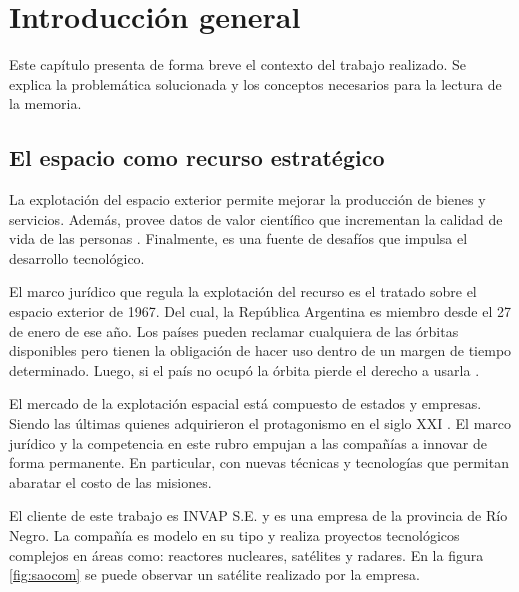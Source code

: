 \chapter{Introducción general}
\label{ch:introduccion}

Este capítulo presenta de forma breve el contexto del trabajo realizado.
Se explica la problemática solucionada y los conceptos necesarios para la lectura de la memoria.

\newcommand{\keyword}[1]{\textbf{#1}}
\newcommand{\tabhead}[1]{\textbf{#1}}
\newcommand{\code}[1]{\texttt{#1}}
\newcommand{\file}[1]{\texttt{\bfseries#1}}
\newcommand{\option}[1]{\texttt{\itshape#1}}
\newcommand{\grados}{$^{\circ}$}

\section{El espacio como recurso estratégico}
\label{sec:1space}

La explotación del espacio exterior permite mejorar la producción de bienes y servicios.
Además, provee datos de valor científico que incrementan la calidad de vida de las personas \citep{BOOK:spaceage}.
Finalmente, es una fuente de desafíos que impulsa el desarrollo tecnológico.

El marco jurídico que regula la explotación del recurso es el tratado sobre el espacio exterior de 1967.
Del cual, la República Argentina es miembro desde el 27 de enero de ese año.
Los países pueden reclamar cualquiera de las órbitas disponibles pero tienen la obligación de hacer uso dentro de un margen de tiempo determinado.
Luego, si el país no ocupó la órbita pierde el derecho a usarla \citep{BOOK:resurrect}.

El mercado de la explotación espacial está compuesto de estados y empresas.
Siendo las últimas quienes adquirieron el protagonismo en el siglo XXI \citep{ARTICLE:transition}.
El marco jurídico y la competencia en este rubro empujan a las compañías a innovar de forma permanente.
En particular, con nuevas técnicas y tecnologías que permitan abaratar el costo de las misiones.

El cliente de este trabajo es INVAP S.E. y es una empresa de la provincia de Río Negro.
La compañía es modelo en su tipo y realiza proyectos tecnológicos complejos en áreas como: reactores nucleares, satélites y radares.
En la figura \ref{fig:saocom} se puede observar un satélite realizado por la empresa.

\newpage

